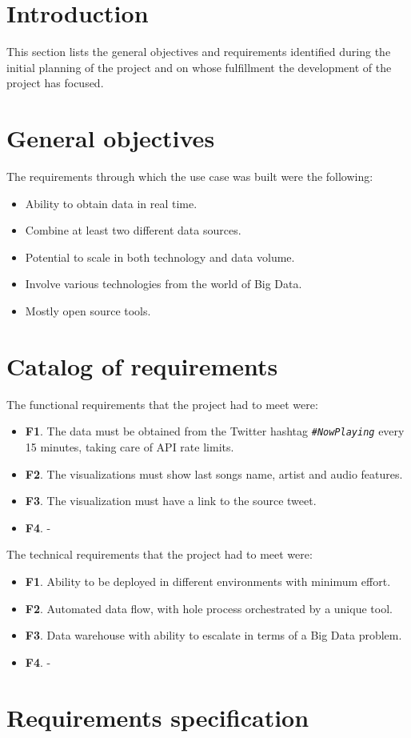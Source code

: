 
\section{Introduction}

\nonzeroparskip This section lists the general objectives and requirements identified during the initial planning of the project and on whose fulfillment the development of the project has focused.

\section{General objectives}

\nonzeroparskip The requirements through which the use case was built were the following:
\begin{itemize}
	\item Ability to obtain data in real time.
	\item Combine at least two different data sources.
	\item Potential to scale in both technology and data volume.
	\item Involve various technologies from the world of Big Data.
	\item Mostly open source tools.
\end{itemize}

\section{Catalog of requirements}

\nonzeroparskip The functional requirements that the project had to meet were:
\begin{itemize}
	\item \textbf{F1}. The data must be obtained from the Twitter hashtag \texttt{\textit{\#NowPlaying}} every 15 minutes, taking care of API rate limits.
	\item \textbf{F2}. The visualizations must show last songs name, artist and audio features.
	\item \textbf{F3}. The visualization must have a link to the source tweet.
	\item \textbf{F4}. -
\end{itemize}

\nonzeroparskip The technical requirements that the project had to meet were:
\begin{itemize}
	\item \textbf{F1}. Ability to be deployed in different environments with minimum effort.
	\item \textbf{F2}. Automated data flow, with hole process orchestrated by a unique tool.
	\item \textbf{F3}. Data warehouse with ability to escalate in terms of a Big Data problem.
	\item \textbf{F4}. -
\end{itemize}

\section{Requirements specification}


